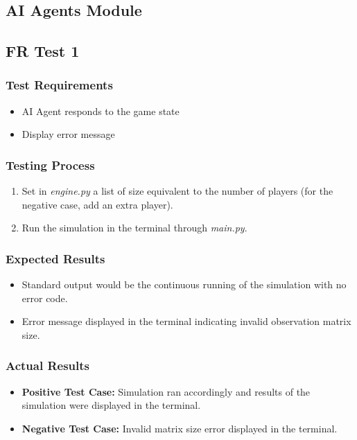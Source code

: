 \documentclass[12pt, titlepage]{article}
\begin{document}
\subsection{AI Agents Module}
\subsection{FR Test 1}
\subsubsection{Test Requirements}
\begin{itemize}
    \item AI Agent responds to the game state 
    \item Display error message
\end{itemize}
\subsubsection{Testing Process}
\begin{enumerate}
    \item Set in \textit{engine.py} a list of size equivalent to the number of players (for the negative case, add an extra player).
    \item Run the simulation in the terminal through \textit{main.py}.
\end{enumerate}
\subsubsection{Expected Results}
\begin{itemize}
    \item Standard output would be the continuous running of the simulation with no error code.
    \item Error message displayed in the terminal indicating invalid observation matrix size.
\end{itemize}
\subsubsection{Actual Results}
\begin{itemize}
    \item \textbf{Positive Test Case:} Simulation ran accordingly and results of the simulation were displayed in the terminal.
    \item \textbf{Negative Test Case:} Invalid matrix size error displayed in the terminal.
\end{itemize}
\end{document}
